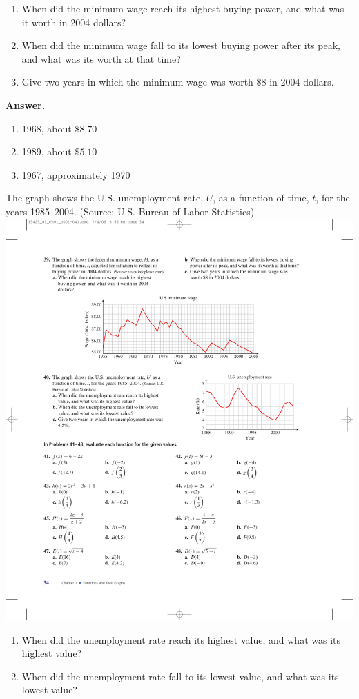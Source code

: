 \documentclass[10pt,]{book}
\theoremstyle{plain}
\theoremstyle{definition}
\theoremstyle{definition}
\theoremstyle{definition}
\begin{document}
\begin{exerciselist}
\begin{exercisegroup}
 \leavevmode%
\begin{enumerate}[label=\alph*]
\item\hypertarget{li-138}{}When did the minimum wage reach its highest buying power, and what was it worth in 2004 dollars?%
\item\hypertarget{li-139}{}When did the minimum wage fall to its lowest buying power after its peak, and what was its worth at that time?%
\item\hypertarget{li-140}{}Give two years in which the minimum wage was worth \(\$8\) in 2004 dollars.%
\end{enumerate}
%
\par\smallskip
\noindent\textbf{Answer.}\hypertarget{answer-30}{}\quad
\leavevmode%
\begin{enumerate}[label=\alph*]
\item\hypertarget{li-141}{}1968, about \(\$8.70\)%
\item\hypertarget{li-142}{}1989, about \(\$5.10\)%
\item\hypertarget{li-143}{}1967, approximately 1970%
\end{enumerate}
%
\exercise[40.]\hypertarget{exercise-50}{}The graph shows the U.S. unemployment rate, \(U\), as a function of time, \(t\), for the years 1985–2004. (Source: U.S. Bureau of Labor Statistics) \includegraphics[width=0.6\linewidth]{images/fig-ex-1-2-40}
 \leavevmode%
\begin{enumerate}[label=\alph*]
\item\hypertarget{li-144}{}When did the unemployment rate reach its highest value, and what was its highest value?%
\item\hypertarget{li-145}{}When did the unemployment rate fall to its lowest value, and what was its lowest value?%

\end{enumerate}
\end{exercisegroup}
\end{exerciselist}
\end{document}
